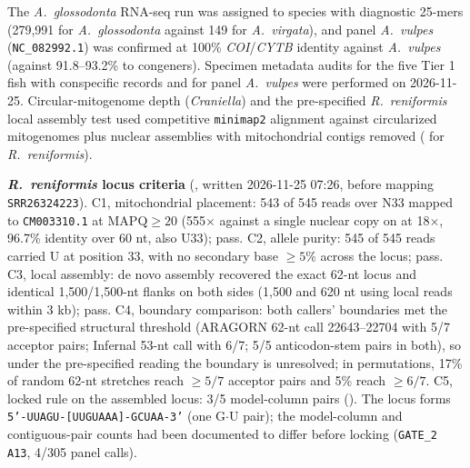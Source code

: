 \documentclass[11pt, a4paper]{article}
\begin{document}
The \textit{A.\ glossodonta} RNA-seq run was assigned to species with diagnostic 25-mers (279,991 for \textit{A.\ glossodonta} against 149 for \textit{A.\ virgata}), and panel \textit{A.\ vulpes} (\texttt{NC\_082992.1}) was confirmed at 100\% \textit{COI}/\textit{CYTB} identity against \textit{A.\ vulpes} (against 91.8--93.2\% to congeners). Specimen metadata audits for the five Tier 1 fish with conspecific records and for panel \textit{A.\ vulpes} were performed on 2026-11-25. Circular-mitogenome depth (\textit{Craniella}) and the pre-specified \textit{R.\ reniformis} local assembly test used competitive \texttt{minimap2} alignment against circularized mitogenomes plus nuclear assemblies with mitochondrial contigs removed ( for \textit{R.\ reniformis}).

\textbf{\textit{R.\ reniformis} locus criteria} (, written 2026-11-25 07:26, before mapping \texttt{SRR26324223}). C1, mitochondrial placement: 543 of 545 reads over N33 mapped to \texttt{CM003310.1} at $\mathrm{MAPQ} \ge 20$ (555$\times$ against a single nuclear copy on  at 18$\times$, 96.7\% identity over 60 nt, also U33); pass. C2, allele purity: 545 of 545 reads carried U at position 33, with no secondary base $\ge 5\%$ across the locus; pass. C3, local assembly: de novo assembly recovered the exact 62-nt locus and identical 1,500/1,500-nt flanks on both sides (1,500 and 620 nt using local reads within 3 kb); pass. C4, boundary comparison: both callers' boundaries met the pre-specified structural threshold (ARAGORN 62-nt call 22643--22704 with 5/7 acceptor pairs; Infernal 53-nt call with 6/7; 5/5 anticodon-stem pairs in both), so under the pre-specified reading the boundary is unresolved; in permutations, 17\% of random 62-nt stretches reach $\ge 5/7$ acceptor pairs and 5\% reach $\ge 6/7$. C5, locked rule on the assembled locus: 3/5 model-column pairs (). The locus forms \texttt{5'-UUAGU-[UUGUAAA]-GCUAA-3'} (one G$\cdot$U pair); the model-column and contiguous-pair counts had been documented to differ before locking (\texttt{GATE\_2 A13}, 4/305 panel calls).
\end{document}
